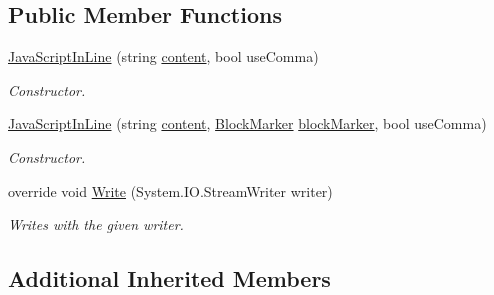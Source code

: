 \subsection*{Public Member Functions}
\begin{DoxyCompactItemize}
\item 
\hyperlink{class_a_rdev_kit_1_1_model_1_1_project_1_1_file_1_1_java_script_in_line_a53ee897c8818a8a6da87860ed4de245f}{Java\-Script\-In\-Line} (string \hyperlink{class_a_rdev_kit_1_1_model_1_1_project_1_1_file_1_1_java_script_line_ac13eaaa9582b295e64a38594f11abb6e}{content}, bool use\-Comma)
\begin{DoxyCompactList}\small\item\em Constructor. \end{DoxyCompactList}\item 
\hyperlink{class_a_rdev_kit_1_1_model_1_1_project_1_1_file_1_1_java_script_in_line_a0bda60059c507dd0d88feeb31d6f6a4d}{Java\-Script\-In\-Line} (string \hyperlink{class_a_rdev_kit_1_1_model_1_1_project_1_1_file_1_1_java_script_line_ac13eaaa9582b295e64a38594f11abb6e}{content}, \hyperlink{class_a_rdev_kit_1_1_model_1_1_project_1_1_file_1_1_block_marker}{Block\-Marker} \hyperlink{class_a_rdev_kit_1_1_model_1_1_project_1_1_file_1_1_abstract_block_a0975ceb65947c7370dcb6565677e9d0e}{block\-Marker}, bool use\-Comma)
\begin{DoxyCompactList}\small\item\em Constructor. \end{DoxyCompactList}\item 
override void \hyperlink{class_a_rdev_kit_1_1_model_1_1_project_1_1_file_1_1_java_script_in_line_a49f0664d2621cc8d5e0589c202c19b10}{Write} (System.\-I\-O.\-Stream\-Writer writer)
\begin{DoxyCompactList}\small\item\em Writes with the given writer. \end{DoxyCompactList}\end{DoxyCompactItemize}
\subsection*{Additional Inherited Members}


